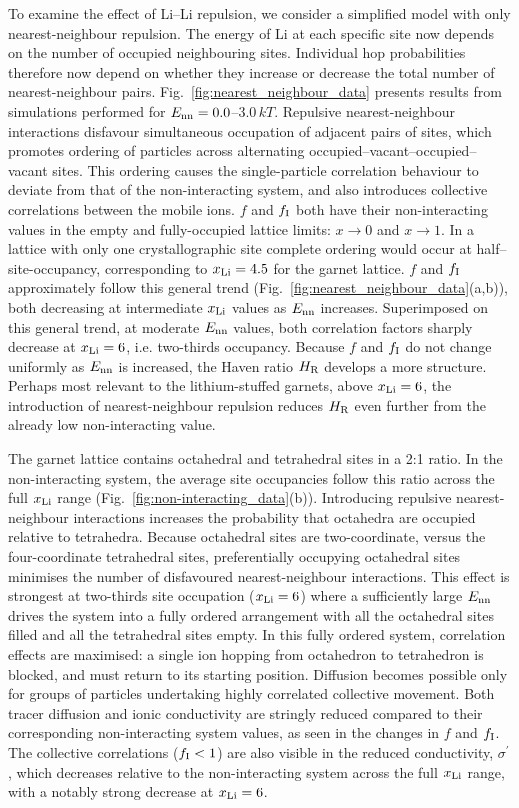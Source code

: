 \documentclass[aps,prb,twocolumn,superscriptaddress,reprint]{revtex4-1}
\newcommand{\xLi}{x_\m{Li}}
\begin{document}
To examine the effect of Li--Li repulsion, we consider a simplified model with only nearest-neighbour repulsion. 
The energy of Li at each specific site now depends on the number of occupied neighbouring sites. Individual hop probabilities therefore now depend on whether they increase or decrease the total number of nearest-neighbour pairs. 
Fig.~\ref{fig:nearest_neighbour_data} presents results from simulations performed for $E_{\mathrm{nn}}=0.0$--$3.0\,kT$. 
Repulsive nearest-neighbour interactions disfavour simultaneous occupation of adjacent pairs of sites, which promotes ordering of particles across alternating  occupied--vacant--occupied--vacant sites.
This ordering causes the single-particle correlation behaviour to deviate from that of the non-interacting system, and also introduces collective correlations between the mobile ions.\cite{Murch_SolStatIonics1982} $f$ and $f_{\mathrm{I}}$ both have their non-interacting values in the empty and fully-occupied lattice limits: $x\to0$ and $x\to1$. In a lattice with only one crystallographic site complete ordering would occur at half--site-occupancy, corresponding to $\xLi=4.5$ for the garnet lattice. $f$ and $f_{\mathrm{I}}$ approximately follow this general trend (Fig.~\ref{fig:nearest_neighbour_data}(a,b)), both decreasing at intermediate $\xLi$ values as $E_{\mathrm{nn}}$ increases. Superimposed on this general trend, at moderate $E_{\mathrm{nn}}$ values, both correlation factors sharply decrease at $\xLi=6$, i.e. two-thirds occupancy. Because $f$ and $f_{\mathrm{I}}$ do not change uniformly as $E_{\mathrm{nn}}$ is increased, the Haven ratio $H_{\mathrm{R}}$ develops a more structure. Perhaps most relevant to the lithium-stuffed garnets, above $\xLi=6$, the introduction of nearest-neighbour repulsion reduces $H_{\mathrm{R}}$ even further from the already low non-interacting value.

The garnet lattice contains octahedral and tetrahedral sites in a 2:1 ratio. In the non-interacting system, the average site occupancies follow this ratio across the full $\xLi$ range (Fig.~\ref{fig:non-interacting_data}(b)). Introducing repulsive nearest-neighbour interactions increases the probability that octahedra are occupied relative to tetrahedra. Because octahedral sites are two-coordinate, versus the four-coordinate tetrahedral sites, preferentially occupying octahedral sites minimises the number of disfavoured nearest-neighbour interactions. This effect is strongest at two-thirds site occupation ($\xLi=6$) where a sufficiently large $E_{\mathrm{nn}}$ drives the system into a fully ordered arrangement with all the octahedral sites filled and all the tetrahedral sites empty. 
In this fully ordered system, correlation effects are maximised: a single ion hopping from octahedron to tetrahedron is blocked, and must return to its starting position. Diffusion becomes possible only for groups of particles undertaking highly correlated collective movement.\cite{BurbanoEtAl_PhysRevLett2016} Both tracer diffusion and ionic conductivity are stringly reduced compared to their corresponding non-interacting system values, as seen in the changes in $f$ and $f_{\mathrm{I}}$. The collective correlations ($f_{\mathrm{I}}<1$) are also visible in the reduced conductivity, $\sigma^\prime$, which decreases relative to the non-interacting system across the full $\xLi$ range, with a notably strong decrease at $\xLi=6$.
\end{document}
